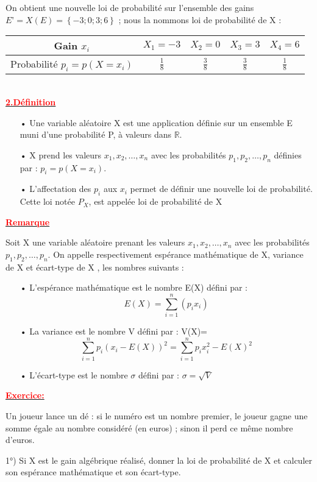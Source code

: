 \documentclass[12pt]{article}
\begin{document}
On obtient une nouvelle loi de probabilité sur l’ensemble des gains\\
$E’ = X(E) = \left\lbrace -3 ;0 ;3 ;6 \right\rbrace $ ; nous la nommons loi de probabilité de X :
\\
\begin{tabular}{|c|c|c|c|c|}
\hline
Gain $x_{i}$ & $X_{1}=-3$ & $X_{2}=0$ & $X_{3}=3$&$X_{4}=6$\\
\hline
Probabilité $p_{i} = p(X = x_{i}) $ &$\frac{1}{8}$ &$\frac{3}{8}$&$\frac{3}{8}$&$\frac{1}{8}$ \\
\hline
\end{tabular}
\\
\underline{\textbf{\textcolor{red}{2.Définition}}}
\begin{itemize}
\item[•] Une variable aléatoire X est une application définie sur un ensemble E muni d’une
probabilité P, à valeurs dans $\mathbb{R}$.
\item[•] X prend les valeurs $x_{1}, x_{2}, …, x_{n}$ avec les probabilités $p_{1}, p_{2}, …, p_{n}$ définies par : $p_{i} = p(X = x_{i})$.
\item[•] L’affectation des $p_{i}$ aux $x_{i}$ permet de définir une nouvelle loi de probabilité. Cette loi notée $P_{X}$, est appelée
loi de probabilité de X
\end{itemize} 
\underline{\textbf{\textcolor{red}{Remarque}}}

Soit X une variable aléatoire prenant les valeurs $x_{1}, x_{2}, …, x_{n}$ avec les probabilités $p_{1}, p_{2}, …, p_{n}$. On appelle respectivement espérance mathématique de X,
variance de X et écart-type de X , les nombres suivants :
\begin{itemize}
\item[•] L’espérance mathématique est le nombre E(X) défini par : \[E(X)=\sum_{i=1}^{n}(p_{i}x_{i})\]
\item[•] La variance est le nombre V défini par : V(X)=\[\sum_{i=1}^{n}p_{i}(x_{i}-E(X))^{2}=\sum_{i=1}^{n}p_{i}x_{i}^{2}-E(X)^{2}\]
\item[•]  L’écart-type est le nombre $\sigma$ défini par : $\sigma = \sqrt{V}$
\end{itemize}
\underline{\textbf{\textcolor{red}{Exercice:}}}

Un joueur lance un dé : si le numéro est un nombre premier, le joueur gagne une somme égale au nombre considéré (en euros) ; sinon il perd ce même nombre d’euros.

1°) Si X est le gain algébrique réalisé, donner la loi de probabilité de X et calculer son espérance mathématique et son écart-type.
\end{document}

